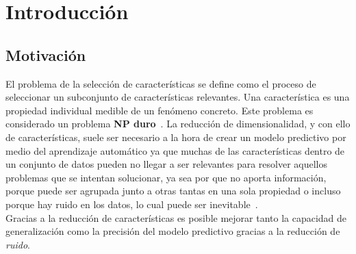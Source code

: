 \chapter{Introducción}
\section{Motivación}\label{motivation}
El problema de la selección de características se define como el proceso de
seleccionar un subconjunto de características relevantes. Una característica es
una propiedad individual medible de un fenómeno concreto. Este problema es
considerado un problema \textbf{NP duro}~\cite{leeuwen_algorithms_1998,johnjeffery_automata}. La reducción de dimensionalidad, y con
ello de características, suele ser necesario a la hora de crear un modelo predictivo por medio
del aprendizaje automático ya que muchas de las características
dentro de un conjunto de datos pueden no llegar a ser relevantes para resolver
aquellos problemas que se intentan solucionar, ya sea por que no aporta información,
porque puede ser agrupada junto a otras tantas en una sola propiedad o incluso porque hay ruido
en los datos, lo cual puede ser inevitable~\cite{Mostafa2012}.\\[6pt]
Gracias a la reducción de características es posible mejorar tanto la capacidad de generalización
como la precisión del modelo predictivo gracias a la reducción de \textit{ruido}.\\[6pt]

